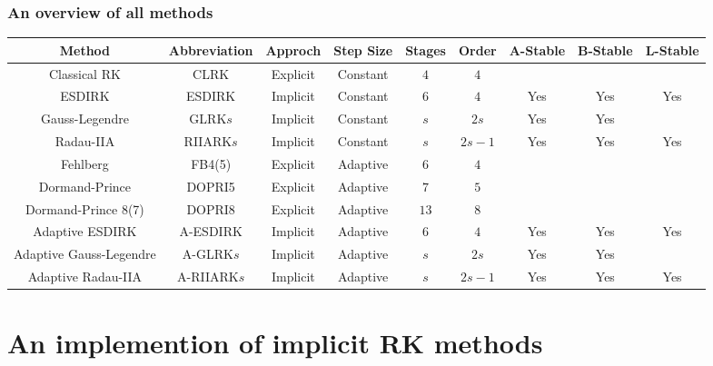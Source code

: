 \documentclass[9pt]{beamer}
\begin{document}
\begin{frame}
  \frametitle{An overview of all methods}
\begin{table}[H]
  \centering
  \tiny
  \renewcommand\arraystretch{1.1}
  \begin{tabular}{cccc|cc|ccc}
  Method          & Abbreviation         & Approch                  &  Step Size         & Stages & Order  & A-Stable & B-Stable & L-Stable  \\ \hline
  Classical RK  & CLRK           & Explicit                  &  Constant        &  $4$   &  $4$    &      &      &            \\
  ESDIRK  & ESDIRK & Implicit  &  Constant        &  $6$   &  $4$    &   Yes   &   Yes   &    Yes   \\
  Gauss-Legendre  & GLRK$s$          & Implicit              &  Constant         &  $s$   &  $2s$    &   Yes   &   Yes   &      \\
  Radau-IIA  & RIIARK$s$             & Implicit              &  Constant         &  $s$   &  $2s-1$    &   Yes   &  Yes   &   Yes   \\
  Fehlberg  &  FB4(5)      & Explicit    &  Adaptive       &  $6$   & $4$  &        &      &         \\
  Dormand-Prince  &  DOPRI5   & Explicit       &  Adaptive       &  $7$   & $5$  &        &      &     \\    
  Dormand-Prince 8(7)  &  DOPRI8     & Explicit     &  Adaptive       &  $13$   & $8$  &        &      &     \\    
  Adaptive ESDIRK  & A-ESDIRK & Implicit  &  Adaptive       &  $6$   &  $4$    &   Yes   &   Yes   &    Yes   \\
  Adaptive Gauss-Legendre & A-GLRK$s$  & Implicit                       &  Adaptive         &  $s$   &  $2s$    &   Yes   &   Yes   &      \\
  Adaptive Radau-IIA & A-RIIARK$s$     & Implicit                       &  Adaptive         &  $s$   &  $2s-1$    &   Yes   &  Yes   &   Yes   
  \end{tabular}
\end{table}
\end{frame}

\section{An implemention of implicit RK methods}
\end{document}

